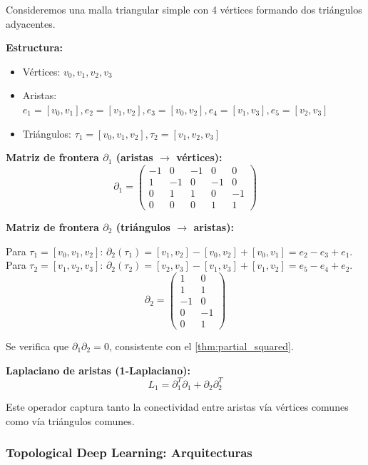\begin{example}\label{ex:hodge_triangle_mesh}
Consideremos una malla triangular simple con 4 vértices formando dos triángulos adyacentes.

\textbf{Estructura:}
\begin{itemize}
    \item Vértices: $v_0, v_1, v_2, v_3$
    \item Aristas: $e_1 = [v_0,v_1], e_2 = [v_1,v_2], e_3 = [v_0,v_2], e_4 = [v_1,v_3], e_5 = [v_2,v_3]$
    \item Triángulos: $\tau_1 = [v_0,v_1,v_2], \tau_2 = [v_1,v_2,v_3]$
\end{itemize}

\textbf{Matriz de frontera $\partial_1$ (aristas $\to$ vértices):}
\[\partial_1 = \begin{pmatrix}
-1 & 0 & -1 & 0 & 0 \\
1 & -1 & 0 & -1 & 0 \\
0 & 1 & 1 & 0 & -1 \\
0 & 0 & 0 & 1 & 1
\end{pmatrix}\]

\textbf{Matriz de frontera $\partial_2$ (triángulos $\to$ aristas):}

Para $\tau_1 = [v_0,v_1,v_2]$: $\partial_2(\tau_1) = [v_1,v_2] - [v_0,v_2] + [v_0,v_1] = e_2 - e_3 + e_1$.
Para $\tau_2 = [v_1,v_2,v_3]$: $\partial_2(\tau_2) = [v_2,v_3] - [v_1,v_3] + [v_1,v_2] = e_5 - e_4 + e_2$.
\[\partial_2 = \begin{pmatrix}
1 & 0 \\
1 & 1 \\
-1 & 0 \\
0 & -1 \\
0 & 1
\end{pmatrix}\]

Se verifica que $\partial_1 \partial_2 = 0$, consistente con el \autoref{thm:partial_squared}.

\textbf{Laplaciano de aristas (1-Laplaciano):}
\[L_1 = \partial_1^T \partial_1 + \partial_2 \partial_2^T\]

Este operador captura tanto la conectividad entre aristas vía vértices comunes como vía triángulos comunes.
\end{example}

\subsubsection{Topological Deep Learning: Arquitecturas}

